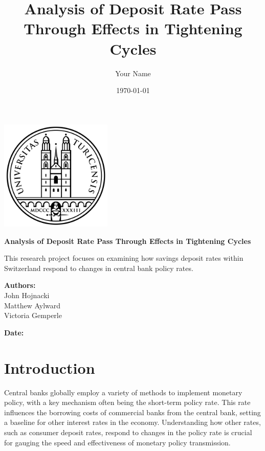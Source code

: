 \documentclass{article}
\title{\textbf{Analysis of Deposit Rate Pass Through Effects in Tightening Cycles}}
\author{Your Name}
\date{\today}
\begin{document}
\begin{titlepage}
    \centering
    \vspace*{-1.5cm} %
    \includegraphics[width=0.4\textwidth]{../../figures/University_of_Zurich_seal.png} %
    
    \vspace{2cm}
    \Huge
    \textbf{Analysis of Deposit Rate Pass Through Effects in Tightening Cycles}
    
    \vspace{1cm}
    \LARGE
    This research project focuses on examining how savings deposit rates within Switzerland respond to changes in central bank policy rates. 
    
    \vspace{1cm}
    \textbf{Authors:}\\ John Hojnacki \\ Matthew Aylward \\ Victoria Gemperle
    \vspace{1cm}
    
    \textbf{Date:}\\
    \thedate
    \vfill
    
\end{titlepage}

\section{Introduction}

\linespread{1}  %

Central banks globally employ a variety of methods to implement monetary policy, with a key mechanism often being the short-term policy rate. This rate influences the borrowing costs of commercial banks from the central bank, setting a baseline for other interest rates in the economy. Understanding how other rates, such as consumer deposit rates, respond to changes in the policy rate is crucial for gauging the speed and effectiveness of monetary policy transmission.\\
\end{document}
